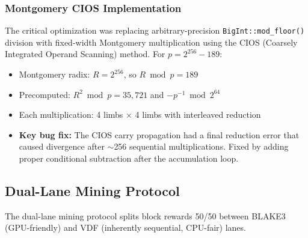 \documentclass[12pt,a4paper]{article}
\begin{document}
\subsubsection{Montgomery CIOS Implementation}

The critical optimization was replacing arbitrary-precision \texttt{BigInt::mod\_floor()} division with fixed-width Montgomery multiplication using the CIOS (Coarsely Integrated Operand Scanning) method. For $p = 2^{256} - 189$:

\begin{itemize}
    \item Montgomery radix: $R = 2^{256}$, so $R \bmod p = 189$
    \item Precomputed: $R^2 \bmod p = 35{,}721$ and $-p^{-1} \bmod 2^{64}$
    \item Each multiplication: 4 limbs $\times$ 4 limbs with interleaved reduction
    \item \textbf{Key bug fix:} The CIOS carry propagation had a final reduction error that caused divergence after $\sim$256 sequential multiplications. Fixed by adding proper conditional subtraction after the accumulation loop.
\end{itemize}

\subsection{Dual-Lane Mining Protocol}

The dual-lane mining protocol splits block rewards 50/50 between BLAKE3 (GPU-friendly) and VDF (inherently sequential, CPU-fair) lanes.

\begin{center}
\end{center}
\end{document}

